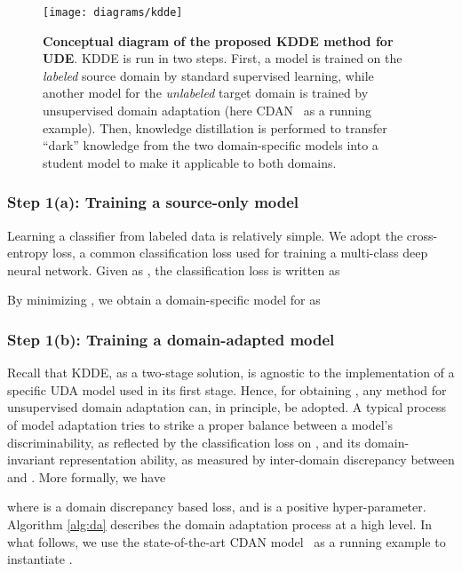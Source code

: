 \begin{figure*}[tbh!]
\setlength{\abovecaptionskip}{5pt}
\centering
\texttt{[image: diagrams/kdde]}
\caption{\textbf{Conceptual diagram of the proposed KDDE method for UDE}. KDDE is run in two steps. First, a model  is trained on the \textit{labeled} source domain by standard supervised learning, while another model  for the \textit{unlabeled} target domain is trained by unsupervised domain adaptation (here CDAN~\cite{nips18-cdan} as a running example). Then, knowledge distillation is performed to transfer ``dark'' knowledge from the two domain-specific models into a student model  to make it applicable to both domains.}
\label{fig:method}
\end{figure*} 

\subsubsection{Step 1(a): Training a source-only model }

Learning a classifier from labeled data is relatively simple. We adopt the cross-entropy loss, a common classification loss used for training a multi-class deep neural network. Given  as , the classification loss is written as
 
By minimizing , we obtain a domain-specific model for  as





\subsubsection{Step 1(b): Training a domain-adapted model }





Recall that KDDE, as a two-stage solution, is agnostic to the implementation of a specific UDA model used in its first stage.
Hence, for obtaining , any method for unsupervised domain adaptation can, in principle, be adopted. 
A typical process of model adaptation tries to strike a proper balance between a model's discriminability, as reflected by the classification loss on , and its domain-invariant representation ability, as measured by inter-domain discrepancy between  and . More formally, we have 

where  is a domain discrepancy based loss, and  is a positive hyper-parameter. Algorithm \ref{alg:da} describes the domain adaptation process at a high level. In what follows, we use the state-of-the-art CDAN model~\cite{nips18-cdan} as a running example to instantiate . 

